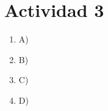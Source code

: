 \section*{Actividad 3}
\begin{enumerate}
	\item[] A) 
	    
	\item[] B) 
		
	\item[] C) 
		
	\item[] D) 
		
\end{enumerate}
